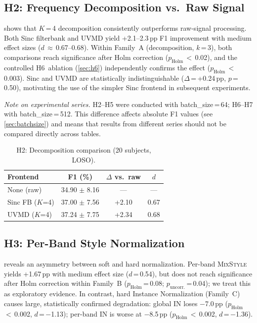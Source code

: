 \documentclass[conference]{IEEEtran}
\newcommand{\pp}{\,pp}
\newcommand{\mixstyle}{\textsc{MixStyle}}
\newcommand{\uvmd}{\textsc{UVMD}}
\begin{document}
\subsection{H2: Frequency Decomposition vs.\ Raw Signal}

 shows that $K$\,=\,4 decomposition consistently outperforms raw-signal processing.
Both Sinc filterbank and \uvmd{} yield +2.1--2.3\pp{} F1 improvement with medium effect sizes ($d$\,$\approx$\,0.67--0.68).
Within Family~A (decomposition, $k$\,=\,3), both comparisons reach significance after Holm correction ($p_{\mathrm{Holm}}$\,$<$\,0.02), and the controlled H6~ablation (\cref{sec:h6}) independently confirms the effect ($p_{\mathrm{Holm}}$\,$<$\,0.003).
Sinc and \uvmd{} are statistically indistinguishable ($\Delta$\,=\,+0.24\pp{}, $p$\,=\,0.50), motivating the use of the simpler Sinc frontend in subsequent experiments.

\emph{Note on experimental series.}
H2--H5 were conducted with batch\_size\,=\,64; H6--H7 with batch\_size\,=\,512.
This difference affects absolute F1 values (see \cref{sec:batchsize}) and means that results from different series should not be compared directly across tables.

\begin{table}[t]
\centering
\caption{H2: Decomposition comparison (20 subjects, LOSO).}
\label{tab:h2}
\begin{tabular}{lccc}
\toprule
Frontend & F1 (\%) & $\Delta$ vs.\ raw & $d$ \\
\midrule
None (raw) & 34.90 $\pm$ 8.16 & --- & --- \\
Sinc FB ($K$=4) & 37.00 $\pm$ 7.56 & +2.10 & 0.67 \\
\uvmd{} ($K$=4) & 37.24 $\pm$ 7.75 & +2.34 & 0.68 \\
\bottomrule
\end{tabular}
\end{table}

\subsection{H3: Per-Band Style Normalization}

 reveals an asymmetry between soft and hard normalization.
Per-band \mixstyle{} yields +1.67\pp{} with medium effect size ($d$\,=\,0.54), but does not reach significance after Holm correction within Family~B ($p_{\mathrm{Holm}}$\,=\,0.08; $p_{\mathrm{uncorr.}}$\,=\,0.04); we treat this as exploratory evidence.
In contrast, hard Instance Normalization (Family~C) causes large, statistically confirmed degradation: global IN loses $-$7.0\pp{} ($p_{\mathrm{Holm}}$\,$<$\,0.002, $d$\,=\,$-$1.13); per-band IN is worse at $-$8.5\pp{} ($p_{\mathrm{Holm}}$\,$<$\,0.002, $d$\,=\,$-$1.36).
\end{document}
